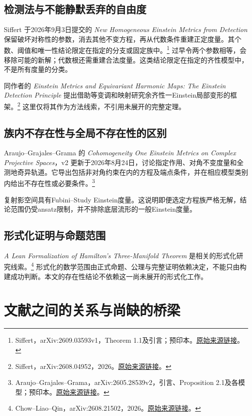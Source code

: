 \documentclass[11pt,a4paper]{article}
\theoremstyle{definition}
\newcommand{\src}[3]{\footnote{\raggedright #1，#2。\href{#3}{原始来源链接}。}}
\begin{document}
\subsection{检测法与不能静默丢弃的自由度}

Siffert 于2026年9月3日提交的 \emph{New Homogeneous Einstein Metrics from Detection} 保留破坏对称性的参数，消去其他不变方程，再从代数条件重建正定度量。其个数、阈值和唯一性结论限定在指定的分支或固定族中。\src{Siffert}{arXiv:2609.03593v1，Theorem 1.1及引言；预印本}{https://arxiv.org/html/2609.03593v1}
过早令两个参数相等，会移除可能的新解；代数根还需重建合法度量。这类结论限定在指定的齐性模型中，不是所有度量的分类。

同作者的 \emph{Einstein Metrics and Equivariant Harmonic Maps: The Einstein Detection Principle} 提出借助等变调和映射研究余齐性一Einstein局部变形的框架。\src{Siffert}{arXiv:2608.04952，2026}{https://arxiv.org/abs/2608.04952}
这里仅将其作为方法线索，不引用未展开的完整定理。

\subsection{族内不存在性与全局不存在性的区别}

Araujo--Grajales--Grama 的 \emph{Cohomogeneity One Einstein Metrics on Complex Projective Spaces}，v2 更新于2026年8月24日，讨论指定作用、对角不变度量和全测地奇异轨道。它导出包括非对角约束在内的方程及端点条件，并在相应模型类别内给出不存在性或必要条件。\src{Araujo--Grajales--Grama}{arXiv:2605.28539v2，引言、Proposition 2.1及各模型；预印本}{https://arxiv.org/html/2605.28539v2}

复射影空间具有Fubini--Study Einstein度量。这说明即便选定方程族严格无解，结论范围仍受ansatz限制，并不排除底层流形的一般Einstein度量。

\subsection{形式化证明与命题范围}

\emph{A Lean Formalization of Hamilton's Three-Manifold Theorem} 是相关的形式化研究线索。\src{Chow--Liao--Qin}{arXiv:2608.21502，2026}{https://arxiv.org/abs/2608.21502}
形式化的数学范围由正式命题、公理与完整证明依赖决定，不能只由构建成功判断。本文的存在性结论不依赖这一尚未展开的形式化工作。

\section{文献之间的关系与尚缺的桥梁}\label{sec:bridges}
\end{document}
